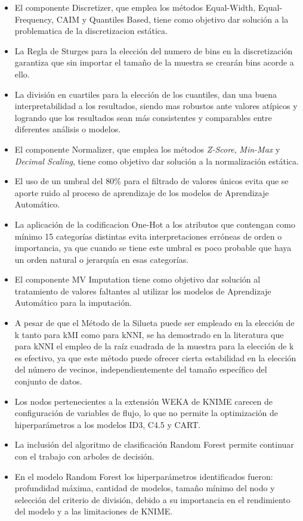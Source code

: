 \begin{itemize}
	\item El componente Discretizer, que emplea los métodos Equal-Width, Equal-Frequency, CAIM y Quantiles Based, tiene como objetivo dar solución a la problematica de la discretizacion estática. 
	\item La Regla de Sturges para la elección del numero de bins en la discretización garantiza que sin importar el tamaño de la muestra se crearán bins acorde a ello.
	\item La división en cuartiles para la elección de los cuantiles, dan una buena interpretabilidad a los resultados, siendo mas robustos ante valores atípicos y logrando que los resultados sean más consistentes y comparables entre diferentes análisis o modelos.
	\item El componente Normalizer, que emplea los métodos \textit{Z-Score}, \textit{Min-Max} y \textit{Decimal Scaling}, tiene como objetivo dar solución a la normalización estática.
	\item El uso de un umbral del 80\% para el filtrado de valores únicos evita que se aporte ruido al proceso de aprendizaje de los modelos de Aprendizaje Automático. 
	\item La aplicación de la codificacion One-Hot a los atributos que contengan como mínimo 15 categorías distintas evita interpretaciones erróneas de orden o importancia, ya que cuando se tiene este umbral es poco probable que haya un orden natural o jerarquía en esas categorías.
	\item El componente MV Imputation tiene como objetivo dar solución al tratamiento de valores faltantes al utilizar los modelos de Aprendizaje Automático para la imputación.
	\item A pesar de que el Método de la Silueta puede ser empleado en la elección de k tanto para kMI como para kNNI, se ha demostrado en la literatura que para kNNI el empleo de la raíz cuadrada de la muestra para la elección de k es efectivo, ya que este método puede ofrecer cierta estabilidad en la elección del número de vecinos, independientemente del tamaño específico del conjunto de datos.
	\item Los nodos pertenecientes a la extensión WEKA de KNIME carecen de configuración de variables de flujo, lo que no permite la optimización de hiperparámetros a los modelos ID3, C4.5 y CART.
	\item La inclusión del algoritmo de clasificación Random Forest permite continuar con el trabajo con arboles de decisión.
	\item En el modelo Random Forest los hiperparámetros identificados fueron: profundidad máxima, cantidad de modelos, tamaño mínimo del nodo y selección del criterio de división, debido a su importancia en el rendimiento del modelo y a las limitaciones de KNIME.

\end{itemize}

